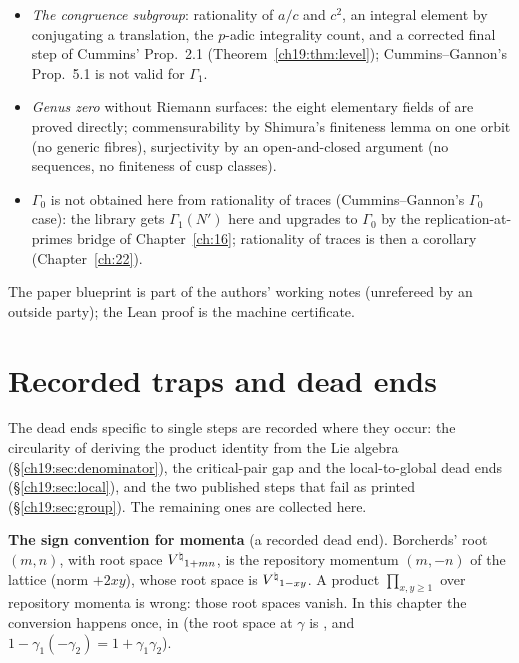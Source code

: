 \begin{itemize}
\item \emph{The congruence subgroup}: rationality of $a/c$ and $c^2$, an integral element by conjugating a translation, the $p$-adic integrality
  count, and a corrected final step of Cummins' Prop.~2.1 (Theorem~\ref{ch19:thm:level}); Cummins--Gannon's Prop.~5.1 is not valid for $\Gamma_1$.
\item \emph{Genus zero} without Riemann surfaces: the eight elementary fields of  are proved directly; commensurability
  by Shimura's finiteness lemma on one orbit (no generic fibres), surjectivity by an open-and-closed argument (no sequences, no finiteness of cusp
  classes).
\item \emph{$\Gamma_0$} is not obtained here from rationality of traces (Cummins--Gannon's $\Gamma_0$ case): the library gets $\Gamma_1(N')$ here and
  upgrades to $\Gamma_0$ by the replication-at-primes bridge of Chapter~\ref{ch:16}; rationality of traces is then a corollary (Chapter~\ref{ch:22}).
\end{itemize}
The paper blueprint is part of the authors' working notes (unrefereed by an outside party); the Lean proof is the machine certificate.

\section{Recorded traps and dead ends}\label{ch19:sec:traps}

The dead ends specific to single steps are recorded where they occur: the circularity of deriving the product identity from the Lie
algebra (\S\ref{ch19:sec:denominator}), the critical-pair gap and the local-to-global dead ends (\S\ref{ch19:sec:local}), and the two
published steps that fail as printed (\S\ref{ch19:sec:group}).  The remaining ones are collected here.

\begin{warning}
\textbf{The sign convention for momenta} (a recorded dead end).  Borcherds' root $(m,n)$, with root space
${V^{\natural}}_{1+mn}$, is the repository momentum $(m,-n)$ of the lattice  (norm $+2xy$), whose root space is ${V^{\natural}}_{1-xy}$.  A product
$\prod_{x,y\ge1}$ over repository momenta is wrong: those root spaces vanish.  In this chapter the conversion happens once, in
 (the root space at $\gamma$ is , and $1-\gamma_1(-\gamma_2)=1+\gamma_1\gamma_2$).
\end{warning}

